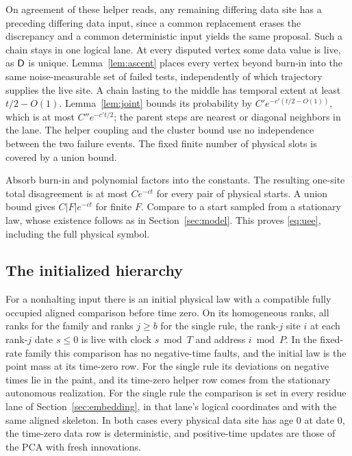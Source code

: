 On agreement of these helper reads, any remaining differing data site has a preceding differing data input, since a common replacement erases the discrepancy and a common deterministic input yields the same proposal. Such a chain stays in one logical lane. At every disputed vertex some data value is live, as \(\mathsf D\) is unique. Lemma~\ref{lem:ascent} places every vertex beyond burn-in into the same noise-measurable set of failed tests, independently of which trajectory supplies the live site. A chain lasting to the middle has temporal extent at least \(t/2-O(1)\). Lemma~\ref{lem:joint} bounds its probability by \(C'e^{-c'(t/2-O(1))}\), which is at most \(C''e^{-c't/2}\); the parent steps are nearest or diagonal neighbors in the lane. The helper coupling and the cluster bound use no independence between the two failure events. The fixed finite number of physical slots is covered by a union bound.

Absorb burn-in and polynomial factors into the constants. The resulting one-site total disagreement is at most \(Ce^{-ct}\) for every pair of physical starts. A union bound gives \(C|F|e^{-ct}\) for finite \(F\). Compare to a start sampled from a stationary law, whose existence follows as in Section~\ref{sec:model}. This proves \eqref{eq:uee}, including the full physical symbol.

\subsection{The initialized hierarchy}\label{sec:initialized}

\begin{lemma}\label{lem:past}
For a nonhalting input there is an initial physical law with a compatible fully occupied aligned comparison before time zero. On its homogeneous ranks, all ranks for the family and ranks \(j\ge b\) for the single rule, the rank-\(j\) site \(i\) at each rank-\(j\) date \(s\le0\) is live with clock \(s\bmod T\) and address \(i\bmod P\). In the fixed-rate family this comparison has no negative-time faults, and the initial law is the point mass at its time-zero row. For the single rule its deviations on negative times lie in the paint, and its time-zero helper row comes from the stationary autonomous realization. For the single rule the comparison is set in every residue lane of Section~\ref{sec:embedding}, in that lane's logical coordinates and with the same aligned skeleton. In both cases every physical data site has age \(0\) at date \(0\), the time-zero data row is deterministic, and positive-time updates are those of the PCA with fresh innovations.
\end{lemma}

